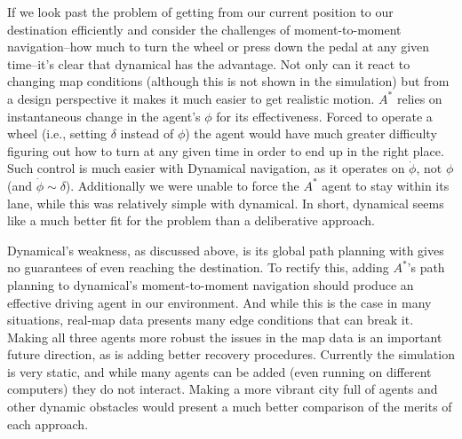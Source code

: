 \documentclass{article}
\begin{document}
If we look past the problem of getting from our current position to
our destination efficiently and consider the challenges of
moment-to-moment navigation--how much to turn the wheel or press down
the pedal at any given time--it's clear that dynamical has the
advantage. Not only can it react to changing map conditions (although
this is not shown in the simulation) but from a design perspective it
makes it much easier to get realistic motion. $A^*$ relies on
instantaneous change in the agent's $\phi$ for its
effectiveness. Forced to operate a wheel (i.e., setting $\delta$
instead of $\phi$) the agent would have much greater difficulty
figuring out how to turn at any given time in order to end up in the
right place. Such control is much easier with Dynamical navigation, as
it operates on $\dot{\phi}$, not $\phi$ (and $\dot{\phi} \sim
\delta$). Additionally we were unable to force the $A^*$ agent to stay
within its lane, while this was relatively simple with dynamical. In
short, dynamical seems like a much better fit for the problem than a
deliberative approach.

Dynamical's weakness, as discussed above, is its global path planning
with gives no guarantees of even reaching the destination. To rectify
this, adding $A^*$'s path planning to dynamical's moment-to-moment
navigation should produce an effective driving agent in our
environment. And while this is the case in many situations, real-map
data presents many edge conditions that can break it. Making all three
agents more robust the issues in the map data is an important future
direction, as is adding better recovery procedures. Currently the
simulation is very static, and while many agents can be added (even
running on different computers) they do not interact. Making a more
vibrant city full of agents and other dynamic obstacles would present
a much better comparison of the merits of each approach.


{}

\end{document}

